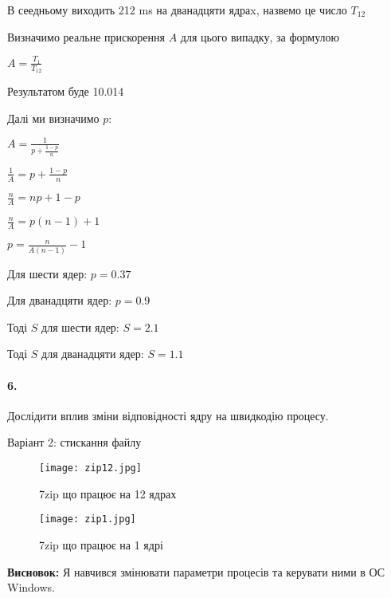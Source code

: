 \documentclass[12pt]{extarticle}
\begin{document}
В сеедньому виходить 212 ms на дванадцяти ядраx, назвемо це число $T_{12}$

Визначимо реальне прискорення $A$ для цього випадку, за формулою 
\vspace{12pt}

$A = \frac{T_1}{T_{12}}$

Результатом буде 10.014
\vspace{12pt}

Далі ми визначимо $p$:

$A = \frac{1}{p + \frac{1-p}{n}}$

\vspace{12pt}

$\frac{1}{A} = p + \frac{1-p}{n}$

\vspace{12pt}

$\frac{n}{A} = np + 1 - p$

\vspace{12pt}

$\frac{n}{A} = p(n-1) + 1$

\vspace{12pt}

$p = \frac{n}{A(n-1)} - 1$

\vspace{12pt}

Для шести ядер: $p = 0.37$

Для дванадцяти ядер: $p = 0.9$

\vspace{12pt}

Тоді $S$ для шести ядер: $S = 2.1$

Тоді $S$ для дванадцяти ядер: $S = 1.1$

\paragraph{6.}
Дослідити вплив зміни відповідності ядру на швидкодію процесу.

Варіант 2: стискання файлу

\vspace{12pt}

\vspace{12pt}
\begin{figure}[H]
    \centering
    \texttt{[image: zip12.jpg]}
    \caption{7zip що працює на 12 ядрах}
\end{figure}
\begin{figure}[H]
    \centering
    \texttt{[image: zip1.jpg]}
    \caption{7zip що працює на 1 ядрі}
\end{figure}
\textbf{Висновок:} Я навчився змінювати параметри процесів та керувати ними в ОС Windows.
\end{document}
